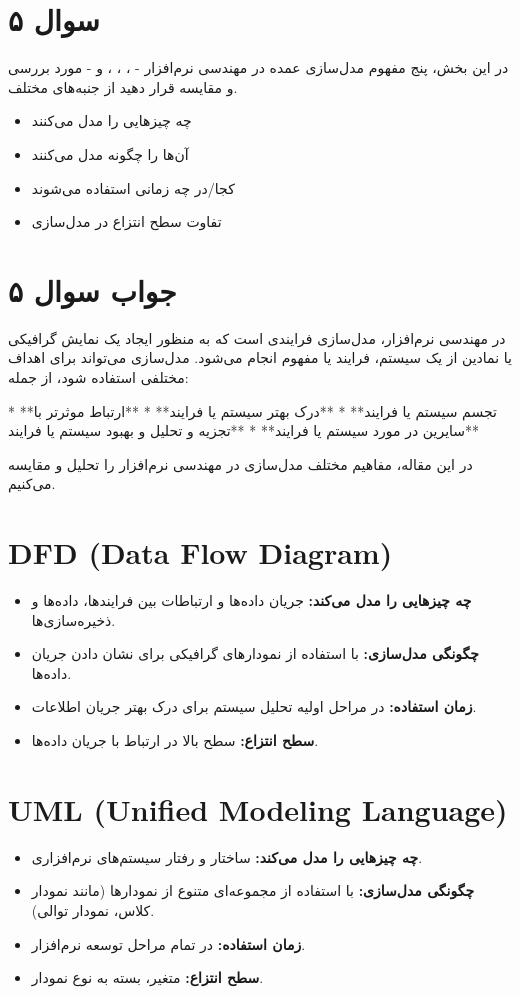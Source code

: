\section*{سوال ۵}

در این بخش، پنج مفهوم مدل‌سازی عمده در مهندسی نرم‌افزار -
،
،
،
و
- مورد بررسی و مقایسه قرار دهید از جنبه‌های مختلف.

\begin{itemize}
	\item چه چیزهایی را مدل می‌کنند
	\item آن‌ها را چگونه مدل می‌کنند
	\item کجا/در چه زمانی استفاده می‌شوند
	\item تفاوت سطح انتزاع در مدل‌سازی
\end{itemize}

\section*{جواب سوال ۵}

در مهندسی نرم‌افزار، مدل‌سازی فرایندی است که به منظور ایجاد یک نمایش گرافیکی یا نمادین از یک سیستم، فرایند یا مفهوم انجام می‌شود. مدل‌سازی می‌تواند برای اهداف مختلفی استفاده شود، از جمله:

* **تجسم سیستم یا فرایند**
* **درک بهتر سیستم یا فرایند**
* **ارتباط موثرتر با سایرین در مورد سیستم یا فرایند**
* **تجزیه و تحلیل و بهبود سیستم یا فرایند**

در این مقاله، مفاهیم مختلف مدل‌سازی در مهندسی نرم‌افزار را تحلیل و مقایسه می‌کنیم.

\section*{DFD (Data Flow Diagram)}
\begin{itemize}
	\item \textbf{چه چیزهایی را مدل می‌کند:} جریان داده‌ها و ارتباطات بین فرایندها، داده‌ها و ذخیره‌سازی‌ها.
	\item \textbf{چگونگی مدل‌سازی:} با استفاده از نمودارهای گرافیکی برای نشان دادن جریان داده‌ها.
	\item \textbf{زمان استفاده:} در مراحل اولیه تحلیل سیستم برای درک بهتر جریان اطلاعات.
	\item \textbf{سطح انتزاع:} سطح بالا در ارتباط با جریان داده‌ها.
\end{itemize}

\section*{UML (Unified Modeling Language)}
\begin{itemize}
	\item \textbf{چه چیزهایی را مدل می‌کند:} ساختار و رفتار سیستم‌های نرم‌افزاری.
	\item \textbf{چگونگی مدل‌سازی:} با استفاده از مجموعه‌ای متنوع از نمودارها (مانند نمودار کلاس، نمودار توالی).
	\item \textbf{زمان استفاده:} در تمام مراحل توسعه نرم‌افزار.
	\item \textbf{سطح انتزاع:} متغیر، بسته به نوع نمودار.
\end{itemize}

